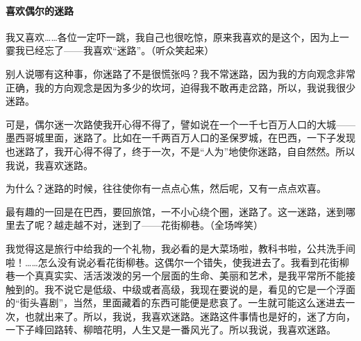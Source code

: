 \paragraph*{喜欢偶尔的迷路}
\par 我又喜欢……各位一定吓一跳，我自己也很吃惊，原来我喜欢的是这个，因为上一霎我已经忘了——我喜欢“迷路”。（听众笑起来）
\par 别人说哪有这种事，你迷路了不是很慌张吗？我不常迷路，因为我的方向观念非常正确，我的方向观念是因为多少的坎坷，迫得我不敢再走岔路，所以，我说我很少迷路。
\par 可是，偶尔迷一次路使我开心得不得了，譬如说在一个一千七百万人口的大城——墨西哥城里面，迷路了。比如在一千两百万人口的圣保罗城，在巴西，一下子发现也迷路了，我开心得不得了，终于一次，不是“人为”地使你迷路，自自然然。所以我说，我喜欢迷路。
\par 为什么？迷路的时候，往往使你有一点点心焦，然后呢，又有一点点欢喜。
\par 最有趣的一回是在巴西，要回旅馆，一不小心绕个圈，迷路了。这一迷路，迷到哪里去了呢？越走越不对，迷到了——花街柳巷。（全场哗笑）
\par 我觉得这是旅行中给我的一个礼物，我必看的是大菜场啦，教科书啦，公共洗手间啦！……怎么没有说必看花街柳巷。这偶尔一个错失，使我进去了。我看到花街柳巷一个真真实实、活活泼泼的另一个层面的生命、美丽和艺术，是我平常所不能接触到的。我不说它是低级、中级或者高级，我现在要说的是，看见的它是一个浮面的“街头喜剧”，当然，里面藏着的东西可能便是悲哀了。一生就可能这么迷进去一次，也就出来了。所以，我说，我喜欢迷路。迷路这件事情也是好的，迷了方向，一下子峰回路转、柳暗花明，人生又是一番风光了。所以我说，我喜欢迷路。
